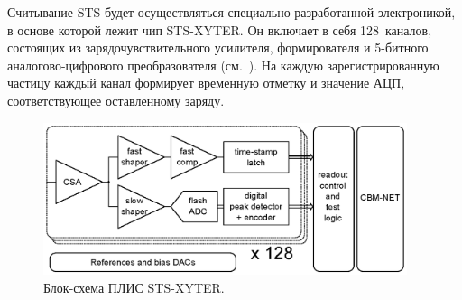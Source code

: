 Считывание STS будет осуществляться специально разработанной электроникой, в основе которой лежит чип STS-XYTER. Он включает в себя 128~каналов, состоящих из зарядочувствительного усилителя, формирователя и 5-битного аналогово-цифрового преобразователя (см.~). На каждую зарегистрированную частицу каждый канал формирует временную отметку и значение АЦП, соответствующее оставленному заряду.


\begin{figure}[H]
\includegraphics[width=0.95\textwidth]{pictures/STSXYTER.png}
\caption{Блок-схема ПЛИС STS-XYTER.}
\label{fig:STSXYTER}
\end{figure}



